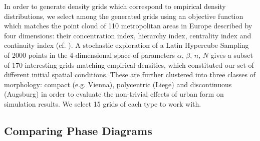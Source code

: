 \documentclass[Afour,sageh,times]{sagej}
\begin{document}
In order to generate density grids which correspond to empirical density distributions, we select among the generated grids using an objective function which matches the point cloud of 110 metropolitan areas in Europe described by four dimensions: their concentration index, hierarchy index, centrality index and continuity index (cf. \cite{LeNechet2015}). A stochastic exploration of a Latin Hypercube Sampling of 2000 points in the 4-dimensional space of parameters {$\alpha$, $\beta$, $n$, $N$} gives a subset of 170 interesting grids matching empirical densities, which constituted our set of different initial spatial conditions. These are further clustered into three classes of morphology: compact (e.g. Vienna), polycentric (Liege) and discontinuous (Augsburg) in order to evaluate the non-trivial effects of urban form on simulation results. We select 15 grids of each type to work with.



\subsection{Comparing Phase Diagrams}
\end{document}
